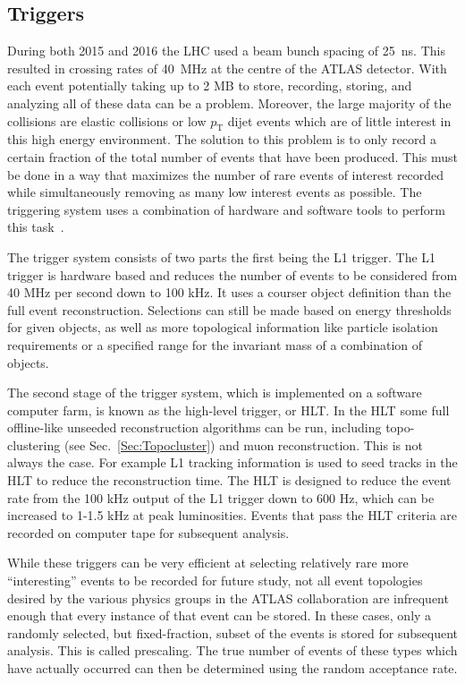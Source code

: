 \subsection{Triggers}
\label{Trig}
During both 2015 and 2016 the LHC used a beam bunch spacing of 25~ns.  
This resulted in crossing rates of 40~MHz at the centre of the ATLAS detector.  
With each event potentially taking up to 2 MB to store, recording, storing, and analyzing all of these data can be a problem.  
Moreover, the large majority of the collisions are elastic collisions or low $p_{\mathrm T}$ dijet events which are of little interest in this high energy environment.  
The solution to this problem is to only record a certain fraction of the total number of events that have been produced.  
This must be done in a way that maximizes the number of rare events of interest recorded while simultaneously removing as many low interest events as possible.  
The triggering system uses a combination of hardware and software tools to perform this task~\cite{Run2Triggers}.  

The trigger system consists of two parts the first being the \gls{L1} trigger.  
The L1 trigger is hardware based and reduces the number of events to be considered from 40 MHz per second down to 100 kHz.  
It uses a courser object definition than the full event reconstruction.  
Selections can still be made based on energy thresholds for given objects, as well as more topological information like particle isolation requirements or a specified range for the invariant mass of a combination of objects.  

The second stage of the trigger system, which is implemented on a software computer farm, is known as the high-level trigger, or HLT.  
In the HLT some full offline-like unseeded reconstruction algorithms can be run, including topo-clustering (see Sec.~\ref{Sec:Topocluster}) and muon reconstruction.  
This is not always the case.  
For example L1 tracking information is used to seed tracks in the HLT to reduce the reconstruction time.  
The HLT is designed to reduce the event rate from the 100 kHz output of the L1 trigger down to 600 Hz, which can be increased to 1-1.5 kHz at peak luminosities.  
Events that pass the HLT criteria are recorded on computer tape for subsequent analysis.   

While these triggers can be very efficient at selecting relatively rare more ``interesting'' events to be recorded for future study, not all event topologies desired by the various physics groups in the ATLAS collaboration are infrequent enough that every instance of that event can be stored.  
In these cases, only a randomly selected, but fixed-fraction, subset of the events is stored for subsequent analysis.  
This is called prescaling.  
The true number of events of these types which have actually occurred can then be determined using the random acceptance rate.  
 
 
 





